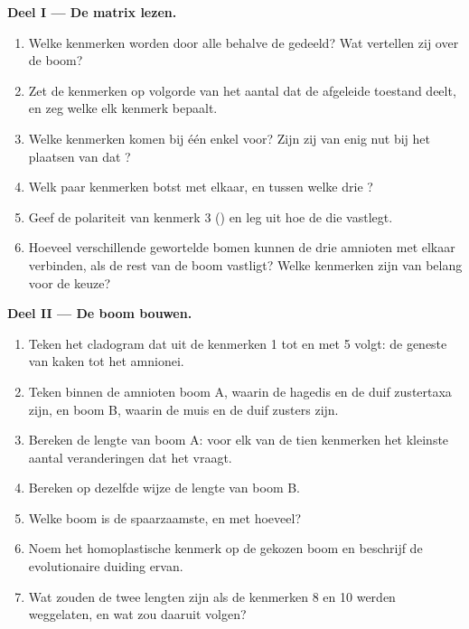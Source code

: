 \begin{problem}
\medskip
\noindent\textbf{Deel I --- De matrix lezen.}
\begin{enumerate}
  \item Welke kenmerken worden door alle  behalve de 
        gedeeld? Wat vertellen zij over de boom?
  \item Zet de kenmerken op volgorde van het aantal  dat de afgeleide
        toestand deelt, en zeg welke  elk kenmerk bepaalt.
  \item Welke kenmerken komen bij één enkel  voor? Zijn zij van enig
        nut bij het plaatsen van dat ?
  \item Welk paar kenmerken botst met elkaar, en tussen welke drie ?
  \item Geef de polariteit van kenmerk 3 () en leg uit hoe de
         die vastlegt.
  \item Hoeveel verschillende gewortelde bomen kunnen de drie amnioten met
        elkaar verbinden, als de rest van de boom vastligt? Welke
        kenmerken zijn van belang voor de keuze?
\end{enumerate}

\medskip
\noindent\textbf{Deel II --- De boom bouwen.}
\begin{enumerate}[resume]
  \item Teken het cladogram dat uit de kenmerken 1 tot en met 5 volgt: de
        geneste  van kaken tot het amnionei.
  \item Teken binnen de amnioten boom A, waarin de hagedis en de duif
        zustertaxa zijn, en boom B, waarin de muis en de duif zusters
        zijn.
  \item Bereken de lengte van boom A: voor elk van de tien kenmerken het
        kleinste aantal veranderingen dat het vraagt.
  \item Bereken op dezelfde wijze de lengte van boom B.
  \item Welke boom is de spaarzaamste, en met hoeveel?
  \item Noem het homoplastische kenmerk op de gekozen boom en beschrijf de
        evolutionaire duiding ervan.
  \item Wat zouden de twee lengten zijn als de kenmerken 8 en 10 werden
        weggelaten, en wat zou daaruit volgen?
\end{enumerate}


\end{problem}
